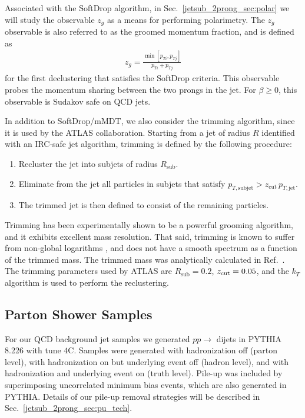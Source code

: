 \documentclass[11pt]{cernrep}
\begin{document}
Associated with the SoftDrop algorithm, in Sec.~\ref{jetsub_2prong_sec:polar} we will study the observable $z_g$ as a means for performing polarimetry.
%
The $z_g$ observable is also referred to as the groomed momentum fraction, and is defined as
%
\begin{align}
z_g=\frac{\min\left[ p_{Ti}, p_{Tj}  \right]}{p_{Ti}+p_{Tj}}
\end{align}
%
for the first declustering that satisfies the SoftDrop criteria.
%
This observable probes the momentum sharing between the two prongs in the
jet. For $\beta \ge 0$, this observable is Sudakov safe \cite{Larkoski:2013paa,Larkoski:2015lea} on QCD
jets.

In addition to SoftDrop/mMDT, we also consider the trimming algorithm, since it is used by the ATLAS collaboration.
%
Starting from a jet of radius $R$ identified with an IRC-safe jet algorithm, trimming is defined by the following procedure:
%
\begin{enumerate}
%
\item Recluster the jet into subjets of radius $R_{\text{sub}}$.
%
\item Eliminate from the jet all particles in subjets that satisfy
  $p_{T,\text{subjet}} > z_{\text{cut}} \, p_{T,\text{jet}}$.
%
\item The trimmed jet is then defined to consist of the remaining particles.
%
\end{enumerate}
%
Trimming has been experimentally shown to be a powerful grooming algorithm, and it exhibits excellent mass resolution.
%
That said, trimming is known to suffer from non-global logarithms \cite{Dasgupta:2001sh}, and does not have a smooth spectrum as a function of the trimmed mass.
%
The trimmed mass was analytically calculated in Ref.~\cite{Dasgupta:2013ihk}.
%
The trimming parameters used by ATLAS are $R_{\text{sub}}=0.2$,  $ {z_{\rm cut}}=0.05$, and the $k_T$ algorithm is used to perform the reclustering.


\subsection{Parton Shower Samples}\label{jetsub_2prong_sec:samples_sub}



For our QCD background jet samples we generated $pp\to$ dijets in \textsc{PYTHIA} 8.226 \cite{Sjostrand:2006za,Sjostrand:2007gs} with tune $4$C. 
%
Samples were generated with hadronization off (parton level), with hadronization on but underlying event off (hadron level), and with hadronization and underlying event on (truth level). Pile-up was included by superimposing uncorrelated minimum bias events, which are also generated in \textsc{PYTHIA}. Details of our pile-up removal strategies will be described in Sec.~\ref{jetsub_2prong_sec:pu_tech}.
\end{document}
